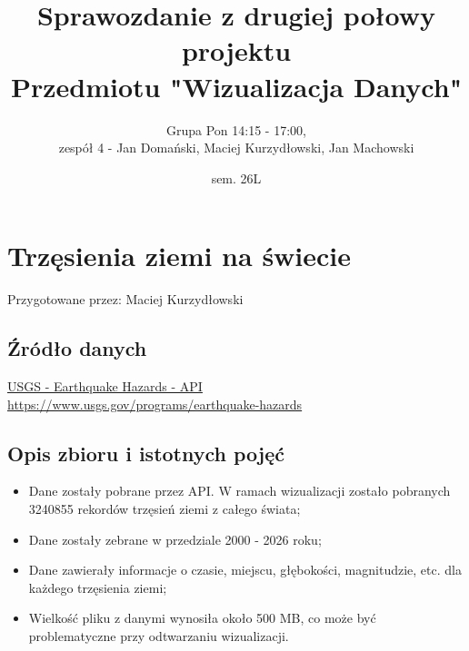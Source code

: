 \documentclass[12pt]{article}
\title{Sprawozdanie z drugiej połowy projektu\\
Przedmiotu "Wizualizacja Danych"}
\author{Grupa Pon 14:15 - 17:00, \\zespół 4 - Jan Domański, Maciej Kurzydłowski, Jan Machowski}
\date{sem. 26L}
\begin{document}
\maketitle
\tableofcontents
\newpage





\section{Trzęsienia ziemi na świecie}

Przygotowane przez: Maciej Kurzydłowski

\subsection{Źródło danych}
\href{https://www.usgs.gov/programs/earthquake-hazards}{USGS - Earthquake Hazards - API}\\
\url{https://www.usgs.gov/programs/earthquake-hazards}

\subsection{Opis zbioru i istotnych pojęć}
\begin{itemize}
    \item Dane zostały pobrane przez API. W ramach wizualizacji zostało pobranych 3240855 rekordów trzęsień ziemi z całego świata;
    \item Dane zostały zebrane w przedziale 2000 - 2026 roku;
    \item Dane zawierały informacje o czasie, miejscu, głębokości, magnitudzie, etc. dla każdego trzęsienia ziemi;
    \item Wielkość pliku z danymi wynosiła około 500 MB, co może być problematyczne przy odtwarzaniu wizualizacji.
\end{itemize}

\newpage
\end{document}
